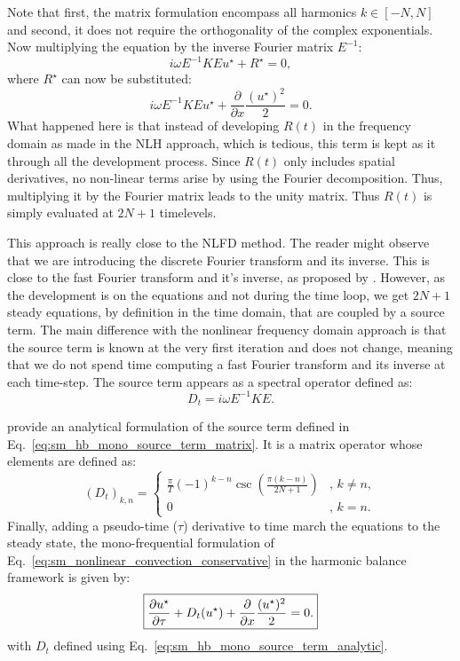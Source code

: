 Note that first, the matrix formulation encompass all harmonics
$k \in [-N, N]$ and second, it does not require the
orthogonality of the complex exponentials.
Now multiplying the equation by the inverse Fourier matrix $E^{-1}$:
\begin{equation}
	i \omega E^{-1} K E u^\star + R^\star = 0,
	\label{eq:sm_hb_matrix_form_mono}
\end{equation}
where $R^\star$ can now be substituted:
\begin{equation}
		i \omega E^{-1} K E u^\star + 
		\displaystyle \frac{\partial}{\partial x}
		\frac{(u^\star)^2}{2} = 0.
\end{equation}
What happened here is that instead of developing $R(t)$
in the frequency domain as made in the NLH approach,
which is tedious, this term is kept
as it through all the development process. 
Since $R(t)$ only includes spatial derivatives, no non-linear
terms
arise by using the Fourier decomposition. Thus, multiplying it
by the Fourier matrix leads to the unity matrix. 
Thus $R(t)$ is simply evaluated at $2N+1$ timelevels.

This approach is really close to the NLFD method.
The reader might observe that we are introducing the discrete Fourier
transform and its inverse. This is close to the fast Fourier transform
and it's inverse, as proposed by \citet{McMullen2001}. However,
as the development is on the equations and not during the time loop,
we get $2N+1$ steady equations, by definition in the time
domain, that are coupled by a source term.
The main difference with the nonlinear frequency domain approach
is that the source term is known at the very first iteration and does
not change, meaning that we do not spend time computing a
fast Fourier transform and its inverse at each time-step.
The source term appears as a spectral operator defined as:
\begin{equation}
	D_t = i \omega E^{-1} K E.
	\label{eq:sm_hb_mono_source_term_matrix}
\end{equation}

\citet{Gopinath2005} provide an analytical formulation of the
source term defined in Eq.~\ref{eq:sm_hb_mono_source_term_matrix}.
It is a matrix operator whose elements are defined as:
\begin{equation}
  (D_t)_{k, n} =
  \begin{cases}
    \frac{\pi}{T}(-1)^{k-n}\csc\left(\frac{\pi
        (k-n)}{2N+1}\right) &, \, k\neq n,\\
    0 &, \, k=n.
  \end{cases}
  \label{eq:sm_hb_mono_source_term_analytic}
\end{equation}
Finally, adding a pseudo-time ($\tau$) derivative to 
time march the equations to the steady state, 
the mono-frequential formulation of 
Eq.~\ref{eq:sm_nonlinear_convection_conservative} in the harmonic
balance framework is given by:
\begin{equation}
	\fbox{$
	\displaystyle \frac{\partial u^\star}{\partial \tau} + 
	D_t (u^\star) + 
	\displaystyle \frac{\partial}{\partial x}
		\frac{(u^\star)^2}{2} = 0.
	$}
\end{equation}
with $D_t$ defined using Eq.~\ref{eq:sm_hb_mono_source_term_analytic}.

